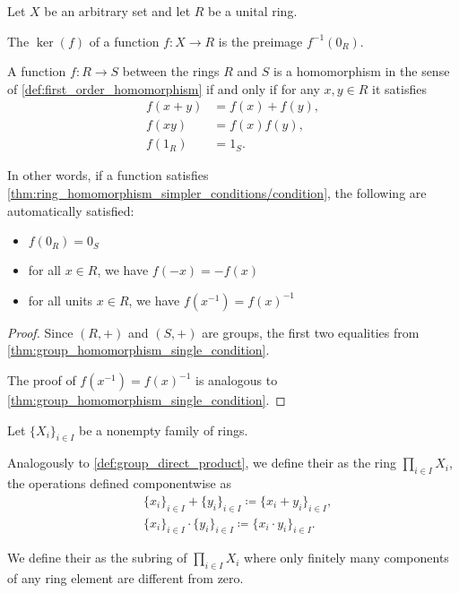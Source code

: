 \begin{definition}\label{def:semiring_kernel}
  Let \( X \) be an arbitrary set and let \( R \) be a unital ring.

  The  \( \ker(f) \) of a function \( f: X \to R \) is the preimage \( f^{-1}(0_R) \).
\end{definition}

\begin{proposition}\label{thm:ring_homomorphism_simpler_conditions}
  A function \( f: R \to S \) between the rings \( R \) and \( S \) is a homomorphism in the sense of \cref{def:first_order_homomorphism} if and only if for any \( x, y \in R \) it satisfies
  \begin{align}\label{thm:ring_homomorphism_simpler_conditions/condition}
    f(x + y) &= f(x) + f(y), \\
    f(xy) &= f(x) f(y), \\
    f(1_R) &= 1_S.
  \end{align}

  In other words, if a function satisfies \cref{thm:ring_homomorphism_simpler_conditions/condition}, the following are automatically satisfied:
  \begin{itemize}
    \item \( f(0_R) = 0_S \)
    \item for all \( x \in R \), we have \( f(-x) = -f(x) \)
    \item for all units \( x \in R \), we have \( f(x^{-1}) = f(x)^{-1} \)
  \end{itemize}
\end{proposition}
\begin{proof}
  Since \( (R, +) \) and \( (S, +) \) are groups, the first two equalities from \cref{thm:group_homomorphism_single_condition}.

  The proof of \( f(x^{-1}) = f(x)^{-1} \) is analogous to \cref{thm:group_homomorphism_single_condition}.
\end{proof}

\begin{definition}\label{def:semiring_direct_product}
  Let \( \{ X_i \}_{i \in I} \) be a nonempty family of rings.

  Analogously to \cref{def:group_direct_product}, we define their  as the ring \( \prod_{i \in I} X_i \), the operations defined componentwise as
  \begin{align*}
    &\{ x_i \}_{i \in I} + \{ y_i \}_{i \in I}
    \coloneqq
    \{ x_i + y_i \}_{i \in I}, \\
    &\{ x_i \}_{i \in I} \cdot \{ y_i \}_{i \in I}
    \coloneqq
    \{ x_i \cdot y_i \}_{i \in I}.
  \end{align*}

  We define their  as the subring of \( \prod_{i \in I} X_i \) where only finitely many components of any ring element are different from zero.
\end{definition}

